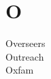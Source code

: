 \section*{O}

\articlesize

\begin{description}
 \item[Overseers]

 \item[Outreach]

 \item[Oxfam]
 \end{description}

\normalsize
